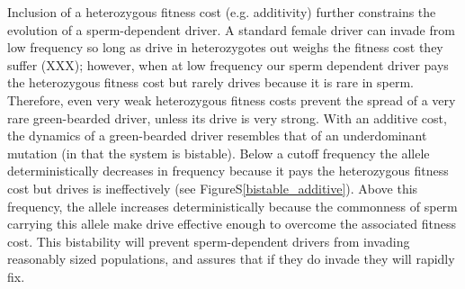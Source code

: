 \documentclass[12pt,letterpaper]{article}
\newcommand{\yb}[1]{{ \color{blue} #1}}
\begin{document}


\yb{Inclusion of a heterozygous fitness cost (e.g. additivity) further constrains the evolution of a sperm-dependent driver. 
A  standard female  driver can invade from low frequency so long as drive in heterozygotes out weighs the fitness cost they suffer (XXX); 
	however, when at low frequency our sperm dependent driver pays the heterozygous fitness cost but rarely drives because it is rare in sperm.
Therefore, even very weak heterozygous fitness costs
	prevent the spread of a very rare green-bearded driver, unless its drive is very strong. 
With an additive cost, the dynamics of a green-bearded driver resembles that of an underdominant mutation (in that the system is bistable). 
Below a cutoff frequency the allele deterministically decreases in frequency 
	because it pays the  heterozygous fitness cost  but drives is ineffectively (see FigureS\ref{bistable_additive}). 
Above this frequency, the allele increases deterministically because the commonness of sperm carrying this allele 
	make drive effective enough to overcome the associated fitness cost.
This bistability will  prevent sperm-dependent drivers from invading 	
	reasonably sized populations, and assures that if they do invade they will rapidly fix.}

\end{document}
